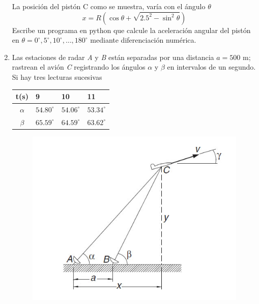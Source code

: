 \documentclass[11pt]{article}
\begin{document}
\begin{enumerate}
\begin{center}
\end{center}
La posici\'{o}n del pist\'{o}n C como se muestra, var\'{i}a con el \'{a}ngulo $\theta$
\[x = R \left( \cos \theta + \sqrt{2.5^{2} - \sin^{2} \theta} \right)\]
Escribe un programa en python que calcule la aceleraci\'{o}n angular del pist\'{o}n en $\theta= 0^{\circ}, 5^{\circ}, 10^{\circ},\ldots, 180^{\circ}$ mediante diferenciaci\'{o}n num\'{e}rica.
\item Las estaciones de radar \textit{A} y \textit{B} est\'{a}n separadas por una distancia $a=500$ m; rastrean el avi\'{o}n \textit{C} registrando los \'{a}ngulos $\alpha$ y $\beta$ en intervalos de un segundo. Si hay tres lecturas sucesivas
\begin{center}
\begin{tabular}{c l l l }
t(s) & 9 & 10 & 11 \\ \hline
$\alpha$ & $54.80^{\circ}$ & $54.06^{\circ}$ & $53.34^{\circ}$ \\ \hline
$\beta$ & $65.59^{\circ}$ & $64.59^{\circ}$ & $63.62^{\circ}$
\end{tabular}
\end{center}
\begin{figure}[H]
	\centering
	\includegraphics[scale=0.5]{Imagenes/ExamenFinal02_01.jpg}  

\end{figure}
\end{enumerate}
\end{document}

